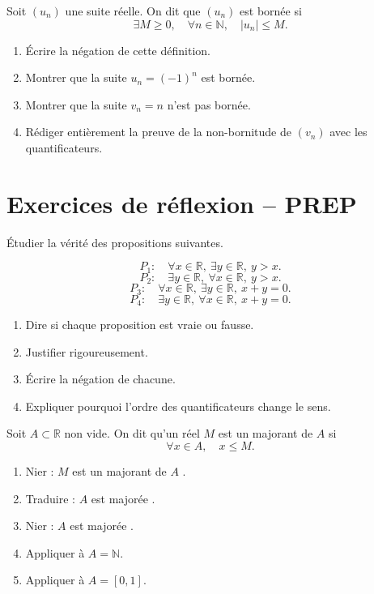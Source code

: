 \documentclass[11pt,a4paper]{article}
\newcommand{\N}{\mathbb{N}}
\newcommand{\R}{\mathbb{R}}
\begin{document}
\begin{exercicebox}
Soit \((u_n)\) une suite réelle. On dit que \((u_n)\) est bornée si
\[
\exists M\geq0,\quad \forall n\in\N,\quad |u_n|\leq M.
\]

\begin{enumerate}[label=\alph*)]
    \item Écrire la négation de cette définition.
    \item Montrer que la suite \(u_n=(-1)^n\) est bornée.
    \item Montrer que la suite \(v_n=n\) n'est pas bornée.
    \item Rédiger entièrement la preuve de la non-bornitude de \((v_n)\) avec les quantificateurs.
\end{enumerate}
\end{exercicebox}

\section{Exercices de réflexion -- PREP}

\begin{exercicebox}
Étudier la vérité des propositions suivantes.

\[
P_1:\quad \forall x\in\R,\ \exists y\in\R,\ y>x.
\]
\[
P_2:\quad \exists y\in\R,\ \forall x\in\R,\ y>x.
\]
\[
P_3:\quad \forall x\in\R,\ \exists y\in\R,\ x+y=0.
\]
\[
P_4:\quad \exists y\in\R,\ \forall x\in\R,\ x+y=0.
\]

\begin{enumerate}[label=\alph*)]
    \item Dire si chaque proposition est vraie ou fausse.
    \item Justifier rigoureusement.
    \item Écrire la négation de chacune.
    \item Expliquer pourquoi l'ordre des quantificateurs change le sens.
\end{enumerate}
\end{exercicebox}

\begin{exercicebox}
Soit \(A\subset\R\) non vide. On dit qu'un réel \(M\) est un majorant de \(A\) si
\[
\forall x\in A,\quad x\leq M.
\]

\begin{enumerate}[label=\alph*)]
    \item Nier : \og \(M\) est un majorant de \(A\) \fg{}.
    \item Traduire : \og \(A\) est majorée \fg{}.
    \item Nier : \og \(A\) est majorée \fg{}.
    \item Appliquer à \(A=\N\).
    \item Appliquer à \(A=[0,1]\).
\end{enumerate}
\end{exercicebox}
\end{document}

